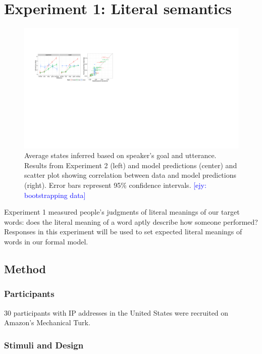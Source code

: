 \documentclass[10pt,letterpaper]{article}
\newcommand{\ejy}[1]{\textcolor{Blue}{[ejy: #1]}}
\begin{document}
\section{Experiment 1: Literal semantics}

\begin{figure}[t]
\begin{centering}
\includegraphics[width=\textwidth]{figures/state-inference-wScatter.pdf}
\caption{\label{fig:exp3} Average states inferred based on speaker's goal and utterance. Results from Experiment 2 (left) and model predictions (center) and scatter plot showing correlation between data and model predictions (right). Error bars represent 95\% confidence intervals.  \ejy{bootstrapping data}}
\end{centering}
\end{figure}

Experiment 1 measured people's judgments of literal meanings of our target words:
does the literal meaning of a word aptly describe how someone performed?
Responses in this experiment will be used to set expected literal meanings of words in our formal model.

\subsection{Method}

\subsubsection{Participants}

30 participants with IP addresses in the United States were recruited on Amazon's Mechanical Turk.

\subsubsection{Stimuli and Design}
\end{document}

